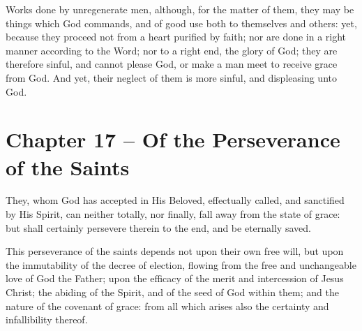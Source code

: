 \begin{outerlst}[left=0pt,labelsep=0pt]
\begin{innerlst}[resume*]
\item Works done by unregenerate men, although, for the matter of them, they may be things which God commands, and of good use both to themselves and others: yet, because they proceed not from a heart purified by faith; nor are done in a right manner according to the Word; nor to a right end, the glory of God; they are therefore sinful, and cannot please God, or make a man meet to receive grace from God. And yet, their neglect of them is more sinful, and displeasing unto God.  
\end{innerlst}

\item
{}
\section{Chapter 17 -- Of the Perseverance of the Saints}
\begin{innerlst}[resume*]

\item They, whom God has accepted in His Beloved, effectually called, and sanctified by His Spirit, can neither totally, nor finally, fall away from the state of grace: but shall certainly persevere therein to the end, and be eternally saved.   

\item This perseverance of the saints depends not upon their own free will, but upon the immutability of the decree of election, flowing from the free and unchangeable love of God the Father; upon the efficacy of the merit and intercession of Jesus Christ; the abiding of the Spirit, and of the seed of God within them; and the nature of the covenant of grace: from all which arises also the certainty and infallibility thereof.   


\end{innerlst}
\end{outerlst}
